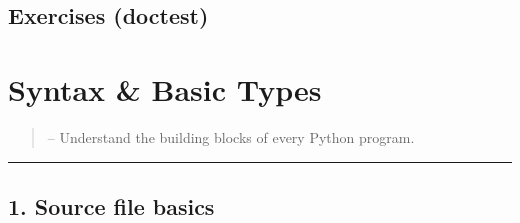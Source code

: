 \documentclass[a4paper,11pt,english]{sphinxmanual}
\begin{document}
\subsection{Exercises (doctest)}
\label{\detokenize{core_language/modules_packages:exercises-doctest}}
\begin{sphinxVerbatim}[commandchars=\\\{\}]
\end{sphinxVerbatim}

\sphinxstepscope


\section{Syntax \& Basic Types}
\label{\detokenize{core_language/syntax_basic_types:syntax-basic-types}}\label{\detokenize{core_language/syntax_basic_types::doc}}\begin{quote}

\sphinxAtStartPar
{} – Understand the building blocks of every Python program.
\end{quote}


\bigskip\hrule\bigskip



\subsection{1. Source file basics}
\label{\detokenize{core_language/syntax_basic_types:source-file-basics}}
\end{document}
